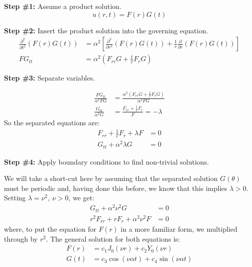 \vspace{0.25cm}

\noindent\textbf{Step \#1:} Assume a product solution.
\begin{equation*}
u(r,t) = F(r)G(t)
\end{equation*}

\vspace{0.25cm}

\noindent\textbf{Step \#2:} Insert the product solution into the governing equation.
\begin{align*}
\frac{\partial^2 }{\partial t^2}\left(F(r)G(t)\right) &= \alpha^2 \left[\frac{\partial^2}{\partial r^2}\left(F(r)G(t) \right) + \frac{1}{r}\frac{\partial}{\partial r}\left(F(r)G(t)\right) \right] \\
FG_{tt} &= \alpha^2 \left(F_{rr}G + \frac{1}{r}F_rG \right)
\end{align*}

\vspace{0.25cm}

\noindent\textbf{Step \#3:} Separate variables.

\begin{align*}
\frac{FG_{tt}}{\alpha^2 FG} &= \frac{\alpha^2 \left(F_{rr}G + \frac{1}{r}F_rG \right)}{\alpha^2 FG} \\
\frac{G_{tt}}{\alpha^2 G} &= \frac{F_{rr} + \frac{1}{r}F_r}{F} = -\lambda
\end{align*}
So the separated equations are:
\begin{align*}
F_{rr} + \frac{1}{r}F_r + \lambda F &= 0 \\
G_{tt} + \alpha^2 \lambda G &= 0
\end{align*}

\vspace{0.25cm}

\noindent\textbf{Step \#4:} Apply boundary conditions to find non-trivial solutions.

\vspace{0.25cm}

\noindent We will take a short-cut here by assuming that the separated solution $G(\theta)$ must be periodic and, having done this before, we know that this implies $\lambda >0$.  Setting $\lambda = \nu^2, \ \nu>0$, we get:
\begin{align*}
G_{tt} + \alpha^2 \nu^2 G &= 0 \\
r^2F_{rr} + rF_r + \alpha^2\nu^2 F &= 0
\end{align*}
where, to put the equation for $F(r)$ in a more familiar form, we multiplied through by $r^2$.  The general solution for both equations is:
\begin{align*}
F(r) &= c_1J_0(\nu r) + c_2 Y_0(\nu r) \\
G(t) &= c_3\cos(\nu \alpha t) + c_4 \sin(\nu \alpha t)
\end{align*}

